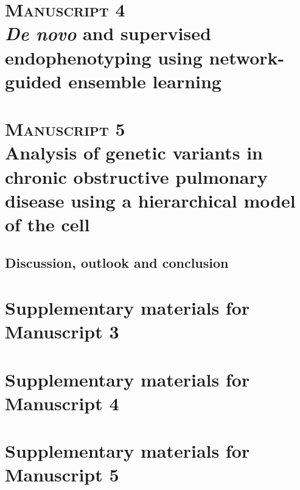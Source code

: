 \documentclass[a4paper,12pt,onecolumn,twoside,final]{memoir}
\begin{document}
\chapter[Manuscript 4: \emph{De novo} and supervised endophenotyping using network-guided ensemble learning]{\textsc{Manuscript 4}\\\emph{De novo} and supervised endophenotyping using network-guided ensemble learning}


\chapter[Manuscript 5: Analysis of genetic variants in chronic obstructive pulmonary disease using a hierarchical model of the cell]{\textsc{Manuscript 5}\\Analysis of genetic variants in chronic obstructive pulmonary disease using a hierarchical model of the cell}


\begin{refsection}
\chapter{Discussion, outlook and conclusion}

\clearpage
\printbibliography[heading=subbibintoc]
\end{refsection}

\backmatter

\chapter{Supplementary materials for Manuscript 3}


\chapter{Supplementary materials for Manuscript 4}


\chapter{Supplementary materials for Manuscript 5}

\end{document}
